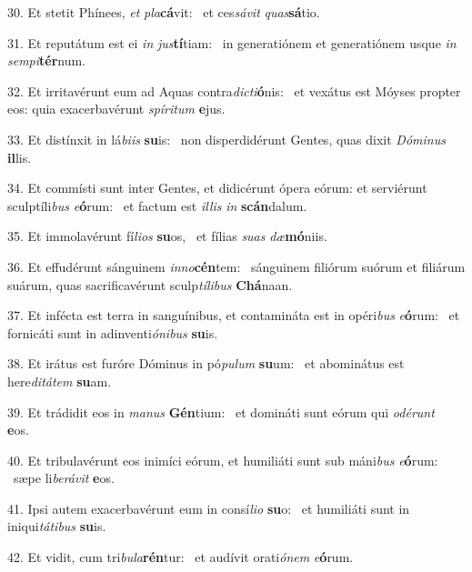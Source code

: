 30. Et stetit Phínees, \textit{et} \textit{pla}\textbf{cá}vit: \ast\  et ces\textit{sá}\textit{vit} \textit{quas}\textbf{sá}tio.\

31. Et reputátum est ei \textit{in} \textit{jus}\textbf{tí}tiam: \ast\  in generatiónem et generatiónem usque \textit{in} \textit{sem}\textit{pi}\textbf{tér}num.\

32. Et irritavérunt eum ad Aquas contra\textit{dic}\textit{ti}\textbf{ó}nis: \ast\  et vexátus est Móyses propter eos: quia exacerbavérunt \textit{spí}\textit{ri}\textit{tum} \textbf{e}jus.\

33. Et distínxit in lá\textit{bi}\textit{is} \textbf{su}is: \ast\  non disperdidérunt Gentes, quas dixit \textit{Dó}\textit{mi}\textit{nus} \textbf{il}lis.\

34. Et commísti sunt inter Gentes, et didicérunt ópera eórum: et serviérunt sculptíli\textit{bus} \textit{e}\textbf{ó}rum: \ast\  et factum est \textit{il}\textit{lis} \textit{in} \textbf{scán}dalum.\

35. Et immolavérunt fí\textit{li}\textit{os} \textbf{su}os, \ast\  et fílias \textit{su}\textit{as} \textit{dæ}\textbf{mó}niis.\

36. Et effudérunt sánguinem \textit{in}\textit{no}\textbf{cén}tem: \ast\  sánguinem filiórum suórum et filiárum suárum, quas sacrificavérunt sculp\textit{tí}\textit{li}\textit{bus} \textbf{Chá}naan.\

37. Et infécta est terra in sanguínibus, et contamináta est in opéri\textit{bus} \textit{e}\textbf{ó}rum: \ast\  et fornicáti sunt in adinventi\textit{ó}\textit{ni}\textit{bus} \textbf{su}is.\

38. Et irátus est furóre Dóminus in pó\textit{pu}\textit{lum} \textbf{su}um: \ast\  et abominátus est here\textit{di}\textit{tá}\textit{tem} \textbf{su}am.\

39. Et trádidit eos in \textit{ma}\textit{nus} \textbf{Gén}tium: \ast\  et domináti sunt eórum qui \textit{o}\textit{dé}\textit{runt} \textbf{e}os.\

40. Et tribulavérunt eos inimíci eórum, et humiliáti sunt sub máni\textit{bus} \textit{e}\textbf{ó}rum: \ast\  sæpe li\textit{be}\textit{rá}\textit{vit} \textbf{e}os.\

41. Ipsi autem exacerbavérunt eum in consí\textit{li}\textit{o} \textbf{su}o: \ast\  et humiliáti sunt in iniqui\textit{tá}\textit{ti}\textit{bus} \textbf{su}is.\

42. Et vidit, cum tri\textit{bu}\textit{la}\textbf{rén}tur: \ast\  et audívit orati\textit{ó}\textit{nem} \textit{e}\textbf{ó}rum.\

